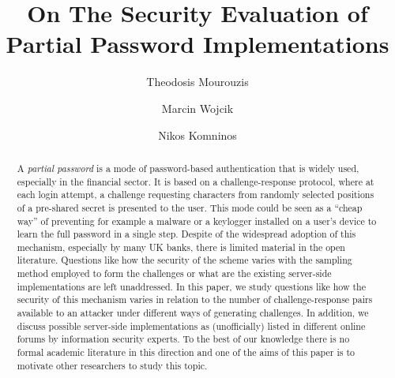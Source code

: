 \documentclass{llncs}
\begin{document}
\title{On The Security Evaluation of Partial Password Implementations}



\author{Theodosis Mourouzis \and Marcin Wojcik
 \and Nikos Komninos }


\maketitle



\begin{abstract}
A \textit{partial password} is a mode of password-based authentication that is
widely used, especially in the financial sector.
It is based on a challenge-response protocol, where at each login attempt,
a challenge requesting characters from randomly selected positions of
a pre-shared secret is presented to the user.
This mode could be seen as a
``cheap way'' of preventing for example
a malware or a keylogger installed on
a user's device to learn the full password in a single step.
Despite of the widespread adoption of this mechanism, especially
by many UK banks, there is
limited material in the open literature.
Questions like how the security of the scheme varies with the
sampling method employed to form the challenges or what are the existing server-side implementations are left unaddressed.
In this paper, we study questions like how the security of this mechanism
varies in relation to the number of challenge-response pairs available to an attacker
under different ways of generating challenges.
In addition, we discuss possible server-side implementations as (unofficially) listed in different online forums 
by information security experts. To the best of our knowledge 
there is no formal academic literature in this direction and one of the aims 
of this paper is to motivate other researchers to 
study this topic. 
\end{abstract}
\end{document}
